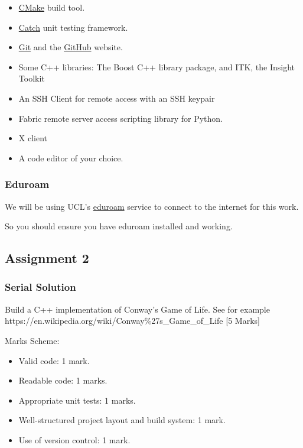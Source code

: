 \begin{itemize}
\itemsep1pt\parskip0pt
\item
  \href{http://www.cmake.org}{CMake} build tool.
\item
  \href{https://github.com/philsquared/Catch}{Catch} unit testing
  framework.
\item
  \href{https://git-scm.com/}{Git} and the
  \href{https://github.com/}{GitHub} website.
\item
  Some C++ libraries: The Boost C++ library package, and ITK, the
  Insight Toolkit
\item
  An SSH Client for remote access with an SSH keypair
\item
  Fabric remote server access scripting library for Python.
\item
  X client
\item
  A code editor of your choice.
\end{itemize}

\subsubsection{Eduroam}\label{eduroam}

We will be using UCL's
\href{http://www.ucl.ac.uk/isd/staff/wireless/eduroam}{eduroam} service
to connect to the internet for this work.

So you should ensure you have eduroam installed and working.

\subsection{Assignment 2}\label{assignment-2}

\subsubsection{Serial Solution}\label{serial-solution}

Build a C++ implementation of Conway's Game of Life. See for example
https://en.wikipedia.org/wiki/Conway\%27s\_Game\_of\_Life {[}5 Marks{]}

Marks Scheme:

\begin{itemize}
\itemsep1pt\parskip0pt
\item
  Valid code: 1 mark.
\item
  Readable code: 1 marks.
\item
  Appropriate unit tests: 1 marks.
\item
  Well-structured project layout and build system: 1 mark.
\item
  Use of version control: 1 mark.
\end{itemize}

